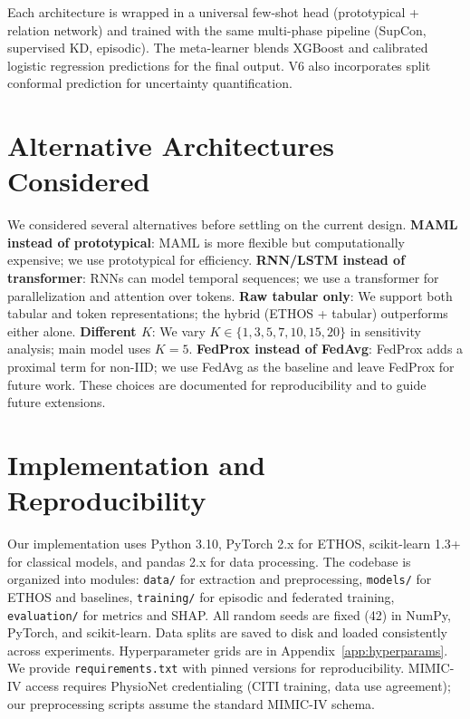 Each architecture is wrapped in a universal few-shot head (prototypical + relation network) and trained with the same multi-phase pipeline (SupCon, supervised KD, episodic). The meta-learner blends XGBoost and calibrated logistic regression predictions for the final output. V6 also incorporates split conformal prediction for uncertainty quantification.

\section{Alternative Architectures Considered}

We considered several alternatives before settling on the current design. \textbf{MAML instead of prototypical}: MAML is more flexible but computationally expensive; we use prototypical for efficiency. \textbf{RNN/LSTM instead of transformer}: RNNs can model temporal sequences; we use a transformer for parallelization and attention over tokens. \textbf{Raw tabular only}: We support both tabular and token representations; the hybrid (ETHOS + tabular) outperforms either alone. \textbf{Different $K$}: We vary $K \in \{1,3,5,7,10,15,20\}$ in sensitivity analysis; main model uses $K=5$. \textbf{FedProx instead of FedAvg}: FedProx adds a proximal term for non-IID; we use FedAvg as the baseline and leave FedProx for future work. These choices are documented for reproducibility and to guide future extensions.

\section{Implementation and Reproducibility}

Our implementation uses Python 3.10, PyTorch 2.x for ETHOS, scikit-learn 1.3+ for classical models, and pandas 2.x for data processing. The codebase is organized into modules: \texttt{data/} for extraction and preprocessing, \texttt{models/} for ETHOS and baselines, \texttt{training/} for episodic and federated training, \texttt{evaluation/} for metrics and SHAP. All random seeds are fixed (42) in NumPy, PyTorch, and scikit-learn. Data splits are saved to disk and loaded consistently across experiments. Hyperparameter grids are in Appendix~\ref{app:hyperparams}. We provide \texttt{requirements.txt} with pinned versions for reproducibility. MIMIC-IV access requires PhysioNet credentialing (CITI training, data use agreement); our preprocessing scripts assume the standard MIMIC-IV schema.

